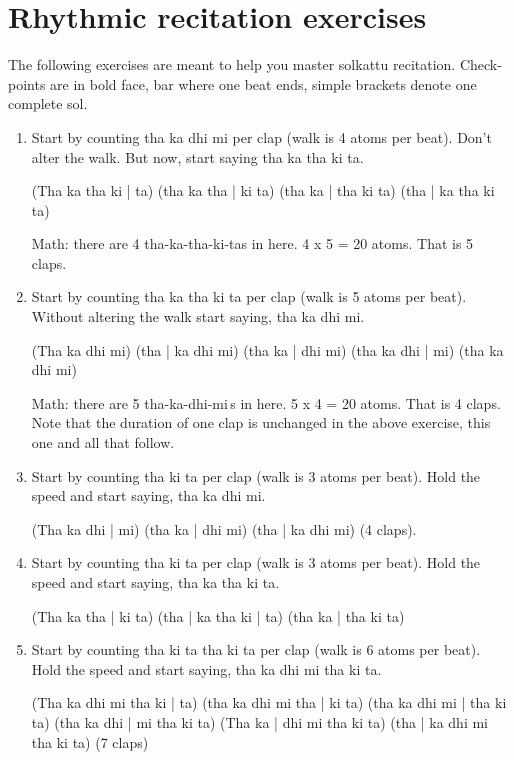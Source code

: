 \chapter{Rhythmic recitation exercises}

The following exercises are meant to help you master solkattu recitation. Check-points
are in bold face, bar where one beat ends, simple brackets denote one complete sol.

\begin{enumerate}
  \item Start by counting tha ka dhi mi per clap (walk is 4 atoms per beat). Don't
    alter the walk. But now, start saying tha ka tha ki ta.
    \begin{center}\ttfamily
    (Tha ka tha ki | ta) (tha ka tha | ki ta) (tha ka | tha ki ta) (tha | ka tha ki ta)
    \end{center}
    Math: there are 4 tha-ka-tha-ki-tas in here. 4 x 5 = 20 atoms. That is 5 claps.

  \item Start by counting tha ka tha ki ta per clap (walk is 5 atoms per beat). Without
    altering the walk start saying, tha ka dhi mi.
    \begin{center}\ttfamily
    (Tha ka dhi mi) (tha | ka dhi mi) (tha ka | dhi mi) (tha ka dhi | mi) (tha ka dhi mi)
    \end{center}
    Math: there are 5 tha-ka-dhi-mi\,s in here. 5 x 4 = 20 atoms. That is 4 claps. Note
    that the duration of one clap is unchanged in the above exercise, this one and all
    that follow.

  \item Start by counting tha ki ta per clap (walk is 3 atoms per beat). Hold the speed
    and start saying, tha ka dhi mi.
    \begin{center}\ttfamily
    (Tha ka dhi | mi) (tha ka | dhi mi) (tha | ka dhi mi) (4 claps).
    \end{center}

  \item Start by counting tha ki ta per clap (walk is 3 atoms per beat). Hold the speed
    and start saying, tha ka tha ki ta.
    \begin{center}\ttfamily
    (Tha ka tha | ki ta) (tha | ka tha ki | ta) (tha ka | tha ki ta)
    \end{center}

  \item Start by counting tha ki ta tha ki ta per clap (walk is 6 atoms per beat). Hold
    the speed and start saying, tha ka dhi mi tha ki ta.
    \begin{center}\ttfamily
    (Tha ka dhi mi tha ki | ta) (tha ka dhi mi tha | ki ta) (tha ka dhi mi | tha ki ta)
    (tha ka dhi | mi tha ki ta) (Tha ka | dhi mi tha ki ta) (tha | ka dhi mi tha ki ta)
    (7 claps)
    \end{center}
\end{enumerate}

